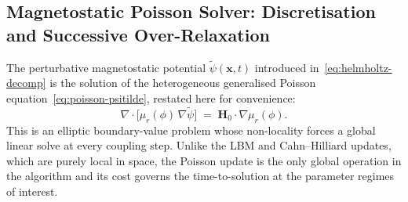 \subsection{Magnetostatic Poisson Solver: Discretisation and Successive Over-Relaxation}
\label{sec:poisson-solver-patch}

The perturbative magnetostatic potential $\tilde{\psi}(\bm{x}, t)$ introduced in~\eqref{eq:helmholtz-decomp} is the solution of the heterogeneous generalised Poisson equation~\eqref{eq:poisson-psitilde}, restated here for convenience:
\begin{equation}
\nabla\!\cdot\!\bigl[\mu_r(\phi)\,\nabla\tilde{\psi}\bigr]
\;=\; \bm{H}_0\!\cdot\!\nabla\mu_r(\phi).
\label{eq:poisson-restated}
\end{equation}
This is an elliptic boundary-value problem whose non-locality forces a global linear solve at every coupling step.
Unlike the LBM and Cahn--Hilliard updates, which are purely local in space, the Poisson update is the only global operation in the algorithm and its cost governs the time-to-solution at the parameter regimes of interest.

